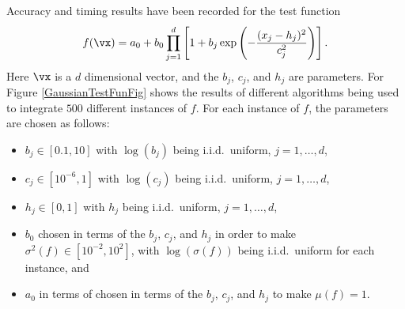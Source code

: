 \documentclass[graybox]{svmult}
\begin{document}
Accuracy and timing results have been recorded for the test function
\begin{equation} \label{GaussianTestFun}
f(\vx)=a_0 + b_0\prod_{j=1}^d\left[ 1 +b_j \exp \left(-\frac{(x_j-h_j)^2}{c_j^2}\right) \right].
\end{equation}
Here $\vx$ is a $d$ dimensional vector, and the $b_j$, $c_j$, and $h_j$ are parameters.  For Figure \ref{GaussianTestFunFig} shows the results of different algorithms being used to integrate $500$ different instances of $f$.  For each instance of $f$, the parameters are chosen as follows:
\begin{itemize} 
\item $b_j \in [0.1,10]$ with $\log(b_j)$ being i.i.d.\ uniform, $j=1, \ldots, d$,
\item $c_j \in [10^{-6},1]$ with $\log(c_j)$ being i.i.d.\ uniform, $j=1, \ldots, d$,
\item $h_j \in [0,1]$ with $h_j$ being i.i.d.\ uniform, $j=1, \ldots, d$,
\item $b_0$ chosen in terms of the $b_j$, $c_j$, and $h_j$ in order to make $\sigma^2(f) \in [10^{-2}, 10^2]$, with $\log(\sigma(f))$ being i.i.d.\ uniform for each instance, and
\item $a_0$ in terms of chosen in terms of the $b_j$, $c_j$, and $h_j$ to make $\mu(f)=1$.
\end{itemize}
\end{document}

